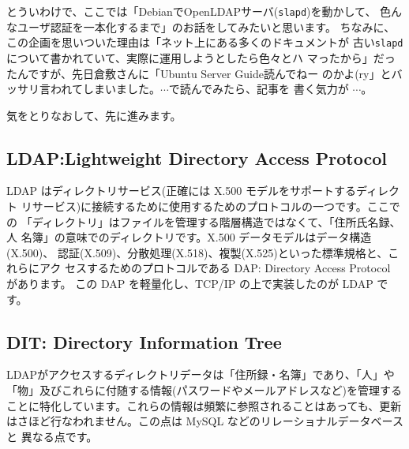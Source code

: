 \documentclass[mingoth,a4paper]{jsarticle}
\begin{document}
とういわけで、ここでは「DebianでOpenLDAPサーバ(\texttt{slapd})を動かして、
色んなユーザ認証を一本化するまで」のお話をしてみたいと思います。
%
ちなみに、この企画を思いついた理由は「ネット上にある多くのドキュメントが
古い\texttt{slapd}について書かれていて、実際に運用しようとしたら色々とハ
マったから」だったんですが、先日倉敷さんに「Ubuntu Server Guide読んでねー
のかよ(ry」とバッサリ言われてしまいました。$\cdots$で読んでみたら、記事を
書く気力が $\cdots$。

気をとりなおして、先に進みます。

\subsection{LDAP:Lightweight Directory Access Protocol}

LDAP はディレクトリサービス(正確には X.500 モデルをサポートするディレクト
リサービス)に接続するために使用するためのプロトコルの一つです。ここでの
「ディレクトリ」はファイルを管理する階層構造ではなくて、「住所氏名録、人
名簿」の意味でのディレクトリです。X.500 データモデルはデータ構造(X.500)、
認証(X.509)、分散処理(X.518)、複製(X.525)といった標準規格と、これらにアク
セスするためのプロトコルである DAP: Directory Access Protocol があります。
この DAP を軽量化し、TCP/IP の上で実装したのが LDAP です。

\subsection{DIT: Directory Information Tree}

LDAPがアクセスするディレクトリデータは「住所録・名簿」であり、「人」や
「物」及びこれらに付随する情報(パスワードやメールアドレスなど)を管理する
ことに特化しています。これらの情報は頻繁に参照されることはあっても、更新
はさほど行なわれません。この点は MySQL などのリレーショナルデータベースと
異なる点です。
\end{document}
